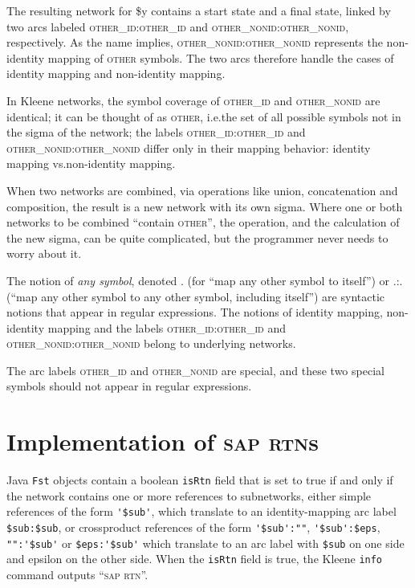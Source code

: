 \documentclass[letterpaper,12pt]{article}
\newcommand{\acro}{\textsc}
\begin{document}
\noindent
The resulting network for \$y contains a start state and a final state,
linked by two arcs labeled \acro{other\_id}:\acro{other\_id} and
\acro{other\_nonid}:\acro{other\_nonid}, respectively.  As the name
implies, \acro{other\_nonid}:\acro{other\_nonid} represents the
non-identity mapping of \acro{other} symbols.  The two arcs therefore
handle the cases of identity mapping and non-identity mapping.

In Kleene networks, the symbol coverage of \acro{other\_id} and
\acro{other\_nonid} are identical; it can be thought of as \acro{other},
i.e.\@ the set of all possible symbols not in the sigma of the network;
the labels \acro{other\_id}:\acro{other\_id} and
\acro{other\_nonid}:\acro{other\_nonid} differ only in their mapping
behavior: identity mapping vs.\@ non-identity mapping.

When two networks are combined, via operations like union, concatenation
and composition, the result is a new network with its own sigma.  Where
one or both networks to be combined ``contain \acro{other}'', the
operation, and the calculation of the new sigma, can be quite
complicated, but the programmer never needs to worry about it.

The notion of \emph{any symbol}, denoted . (for ``map any other symbol to
itself'') or .:. (``map any other symbol to any other symbol, including
itself'') are syntactic notions that appear in regular expressions.  The
notions of identity mapping, non-identity mapping and the labels
\acro{other\_id}:\acro{other\_id} and
\acro{other\_nonid}:\acro{other\_nonid} belong to underlying networks.  

The arc labels \acro{other\_id} and \acro{other\_nonid} are special, and
these two special symbols should not appear in regular expressions.

\newpage
\section{Implementation of \acro{sap} \acro{rtn}s}

\label{app:rtn}

Java \texttt{Fst} objects contain a boolean \texttt{isRtn} field that is
set to true if and only if the network contains one or more references to
subnetworks, either simple references of the form \verb!'$sub'!, which
translate to an identity-mapping arc label \verb!$sub:$sub!, or
crossproduct references of the form \verb!'$sub':""!, \verb!'$sub':$eps!,
\verb!"":'$sub'! or \verb!$eps:'$sub'! which translate to an arc label
with \verb!$sub! on one side and epsilon on the other side.  When the
\texttt{isRtn} field is true, the Kleene \texttt{info} command outputs
``\acro{sap} \acro{rtn}''.
\end{document}
